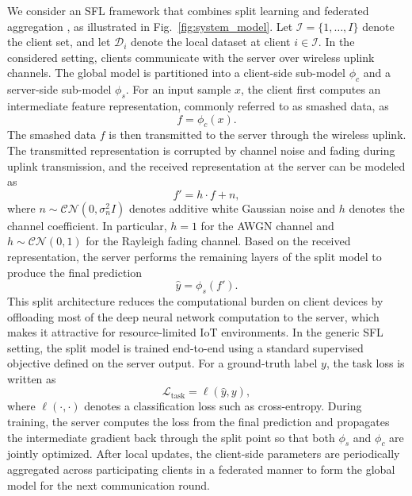 We consider an SFL framework that combines split learning and federated aggregation \cite{gupta2018distributed,thapa2022splitfed}, as illustrated in Fig.~\ref{fig:system_model}. Let $\mathcal{I}=\{1,\ldots,I\}$ denote the client set, and let $\mathcal{D}_i$ denote the local dataset at client $i \in \mathcal{I}$. In the considered setting, clients communicate with the server over wireless uplink channels. The global model is partitioned into a client-side sub-model $\phi_c$ and a server-side sub-model $\phi_s$. For an input sample $x$, the client first computes an intermediate feature representation, commonly referred to as smashed data, as
\begin{equation}
f = \phi_c(x).
\end{equation}
\noindent
The smashed data $f$ is then transmitted to the server through the wireless uplink. The transmitted representation is corrupted by channel noise and fading during uplink transmission, and the received representation at the server can be modeled as
\begin{equation}
f' = h \cdot f + n,
\end{equation}
where $n \sim \mathcal{CN}(0,\sigma_n^2 I)$ denotes additive white Gaussian noise and $h$ denotes the channel coefficient. In particular, $h=1$ for the AWGN channel and $h \sim \mathcal{CN}(0,1)$ for the Rayleigh fading channel. Based on the received representation, the server performs the remaining layers of the split model to produce the final prediction
\begin{equation}
\hat{y} = \phi_s(f').
\end{equation}
This split architecture reduces the computational burden on client devices by offloading most of the deep neural network computation to the server, which makes it attractive for resource-limited IoT environments. In the generic SFL setting, the split model is trained end-to-end using a standard supervised objective defined on the server output. For a ground-truth label $y$, the task loss is written as
\begin{equation}
\mathcal{L}_{\mathrm{task}} = \ell(\hat{y}, y),
\end{equation}
where $\ell(\cdot,\cdot)$ denotes a classification loss such as cross-entropy. During training, the server computes the loss from the final prediction and propagates the intermediate gradient back through the split point so that both $\phi_s$ and $\phi_c$ are jointly optimized. After local updates, the client-side parameters are periodically aggregated across participating clients in a federated manner to form the global model for the next communication round.

